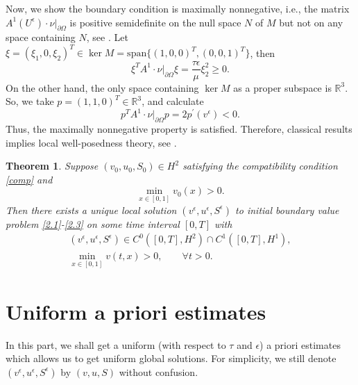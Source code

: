 \documentclass[10pt,reqno]{amsart}
\numberwithin{equation}{section}
\newtheorem{theorem}{Theorem}[section]
\begin{document}
Now, we show the boundary condition is maximally nonnegative, i.e., the matrix $A^1(U^\epsilon) \cdot \nu\big|_{\partial \Omega}$ is positive semidefinite on the null space  $N$ of $M$ but not on any space containing $N$,  see \cite{SCH86}. Let $\xi=(\xi_1, 0, \xi_2)^T\in \ker M=\mathrm{span} \{(1,0,0)^T, (0,0,1)^T\}$, then 
$$
\xi^T A^1\cdot \nu \big|_{\partial\Omega}\xi=\frac{\tau \epsilon}{\mu} \xi_2^2 \ge 0.
$$
On the other hand, the only space containing $\ker M$  as a proper subspace is $\mathbb R^3$. So, we take $p=(1,1,0)^T\in \mathbb R^3$, and calculate 
$$
p^T A^1\cdot \nu \big|_{\partial\Omega} p=2 p^\prime(v^\epsilon) < 0.
$$
Thus, the maximally nonnegative property is satisfied.
Therefore, classical results implies local  well-posedness theory, see \cite{SCH86}.  
\begin{theorem}
Suppose $(v_0, u_0, S_0)\in H^2$ satisfying the compatibility condition \eqref{comp} and $$\min_{x\in[0,1]} v_0(x)>0.$$ Then there exists a unique local solution $(v^\epsilon, u^\epsilon, S^\epsilon)$ to initial boundary value problem \eqref{2.1}-\eqref{2.3} on some time interval $[0, T]$ with
\begin{align*}
(v^\epsilon, u^\epsilon, S^\epsilon)\in C^0([0,T], H^2)\cap C^1([0, T], H^1),\\
\min_{x\in[0,1]} v(t, x)>0,\qquad \forall t >0.
\end{align*}
\end{theorem}


\section{Uniform a priori estimates}
In this part, we shall get a uniform (with respect to $\tau$ and $\epsilon$) a priori estimates  which allows us to get uniform global solutions. 
For simplicity, we still denote $(v^\epsilon, u^\epsilon, S^\epsilon)$ by $(v, u, S)$ without confusion. 
\end{document}
